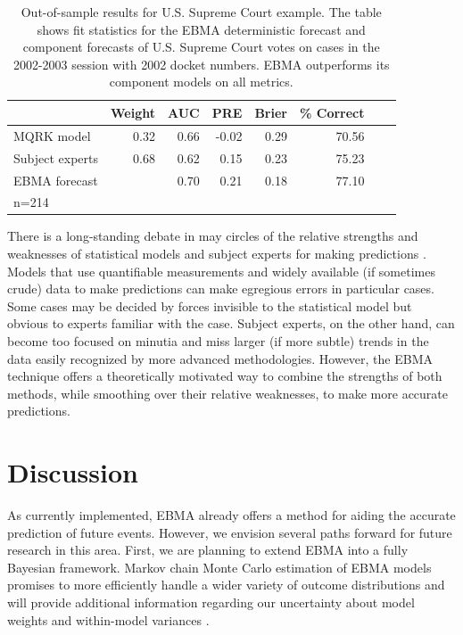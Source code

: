 \begin{table}[ht]
  \caption{\footnotesize Out-of-sample results for U.S. Supreme Court
    example.  The table shows fit statistics for the EBMA deterministic
    forecast and component forecasts of U.S. Supreme Court votes on
    cases in the 2002-2003 session with 2002 docket numbers.   EBMA
    outperforms its component models on all metrics. }
\label{SC-Res} \small
\begin{center}
\begin{tabular}{lrrrrrrr}
\toprule
 & Weight & AUC & PRE & Brier & \% Correct   \\ 
\midrule
MQRK model& 0.32  & 0.66 & -0.02 & 0.29 & 70.56   \\ 
Subject experts & 0.68 & 0.62 & 0.15 & 0.23 & 75.23  \\ 
EBMA forecast&  & 0.70 & 0.21 & 0.18 & 77.10  \\ 
\bottomrule
n=214 
\end{tabular}
\end{center}
\end{table}




There is a long-standing debate in may circles of the relative
strengths and weaknesses of statistical models and subject experts for
making predictions \citep[e.g.,][]{Ascher:1979}.  Models that use
quantifiable measurements and widely available (if sometimes crude)
data to make predictions can make egregious errors in particular
cases.  Some cases may be decided by forces invisible to the
statistical model but obvious to experts familiar with the case.
Subject experts, on the other hand, can become too focused on minutia
and miss larger (if more subtle) trends in the data easily recognized
by more advanced methodologies.  However, the EBMA technique offers a
theoretically motivated way to combine the strengths of both methods,
while smoothing over their relative weaknesses, to make more accurate
predictions.

\section{Discussion}

As currently implemented, EBMA already offers a method for aiding the
accurate prediction of future events.  However, we envision several
paths forward for future research in this area. First, we are planning
to extend EBMA into a fully Bayesian framework. Markov chain Monte
Carlo estimation of EBMA models promises to more efficiently handle a
wider variety of outcome distributions and will provide additional
information regarding our uncertainty about model weights and
within-model variances \citep{Vrugt:2008}.


